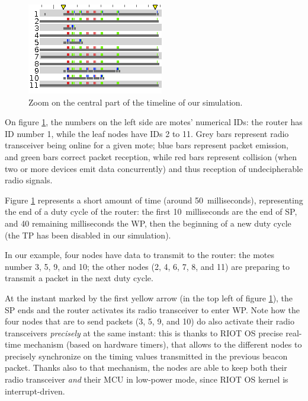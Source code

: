 \documentclass[a4paper,twoside]{article}
\begin{document}
\begin{figure}[pbt]
\centering
\includegraphics{S-CoSenS-Cooja10-Timeline.png}
\caption{Zoom on the central part of the timeline of our simulation.}
\label{ZoomTimeline}
\end{figure}

On figure \ref{ZoomTimeline}, the numbers on the left side are motes'
numerical IDs: the router has ID number \textsf{1}, while the leaf nodes
have IDs \textsf{2} to \textsf{11}. Grey bars represent radio transceiver
being online for a given mote; blue bars represent packet emission, and green
bars correct packet reception, while red bars represent collision (when
two or more devices emit data concurrently) and thus reception of
undecipherable radio signals.

Figure \ref{ZoomTimeline} represents a short amount of time (around
50~milliseconds), representing the end of a duty cycle of the router:
the first 10~milliseconds are the end of SP, and 40 remaining milliseconds
the WP, then the beginning of a new duty cycle (the TP has been disabled
in our simulation). 

In our example, four nodes have data to transmit to the router: the motes
number \textsf{3}, \textsf{5}, \textsf{9}, and \textsf{10}; the other nodes
(\textsf{2}, \textsf{4}, \textsf{6}, \textsf{7}, \textsf{8}, and \textsf{11})
are preparing to transmit a packet in the next duty cycle.

At the instant marked by the first yellow arrow (in the top left of figure
\ref{ZoomTimeline}), the SP ends and the router activates its radio
transceiver to enter WP. Note how the four nodes that are to send packets
(\textsf{3}, \textsf{5}, \textsf{9}, and \textsf{10}) do also activate their
radio transceivers \emph{precisely} at the same instant: this is thanks to
RIOT OS precise real-time mechanism (based on hardware timers), that allows
to the different nodes to precisely synchronize on the timing values
transmitted in the previous beacon packet. Thanks also to that mechanism,
the nodes are able to keep both their radio transceiver \emph{and} their
MCU in low-power mode, since RIOT OS kernel is interrupt-driven.
\end{document}
